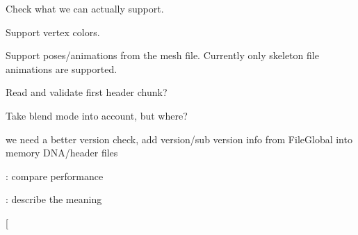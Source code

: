 
\begin{DoxyRefList}
\item[\label{todo__todo000001}%
\hypertarget{todo__todo000001}{}%
Member \hyperlink{class_assimp_1_1_ogre_1_1_ogre_binary_serializer_a3b907a23d6f3d316b4e40767ebda4b68}{Assimp\+:\+:Ogre\+:\+:Ogre\+Binary\+Serializer\+:\+:Import\+Mesh} (Memory\+Stream\+Reader $\ast$reader)]Check what we can actually support.  
\item[\label{todo__todo000003}%
\hypertarget{todo__todo000003}{}%
Class \hyperlink{class_assimp_1_1_ogre_1_1_ogre_importer}{Assimp\+:\+:Ogre\+:\+:Ogre\+Importer} ]Support vertex colors. 

Support poses/animations from the mesh file. Currently only skeleton file animations are supported.  
\item[\label{todo__todo000002}%
\hypertarget{todo__todo000002}{}%
Member \hyperlink{class_assimp_1_1_ogre_1_1_ogre_importer_a9b6609a0b257464d9a1092adf430ebef}{Assimp\+:\+:Ogre\+:\+:Ogre\+Importer\+:\+:Can\+Read} (const std\+::string \&p\+File, I\+O\+System $\ast$p\+I\+O\+Handler, bool check\+Sig) const ]Read and validate first header chunk?  
\item[\label{todo__todo000008}%
\hypertarget{todo__todo000008}{}%
Member \hyperlink{class_assimp_1_1_ogre_1_1_skeleton_a6e29d13ff5cc937a8481c96024da5b0b}{Assimp\+:\+:Ogre\+:\+:Skeleton\+:\+:blend\+Mode} ]Take blend mode into account, but where?  
\item[\label{todo__todo000016}%
\hypertarget{todo__todo000016}{}%
Member \hyperlink{classb_parse_1_1b_file_a2a8cb9d151dfa612f0eb86a705f4bb5d}{b\+Parse\+:\+:b\+File\+:\+:parse\+Internal} (int verbose\+Mode, char $\ast$mem\+Dna, int mem\+Dna\+Length)]we need a better version check, add version/sub version info from File\+Global into memory D\+N\+A/header files  
\item[\label{todo__todo000017}%
\hypertarget{todo__todo000017}{}%
Member \hyperlink{classbt_axis_sweep3_internal_a4e26f4f8acf63f26451f6396223001bb}{bt\+Axis\+Sweep3\+Internal$<$ B\+P\+\_\+\+F\+P\+\_\+\+I\+N\+T\+\_\+\+T\+Y\+P\+E $>$\+:\+:remove\+Handle} (B\+P\+\_\+\+F\+P\+\_\+\+I\+N\+T\+\_\+\+T\+Y\+P\+E handle, \hyperlink{classbt_dispatcher}{bt\+Dispatcher} $\ast$dispatcher)]\+: compare performance  
\item[\label{todo__todo000019}%
\hypertarget{todo__todo000019}{}%
Class \hyperlink{classbt_collision_configuration}{bt\+Collision\+Configuration} ]\+: describe the meaning  
\item[\label{todo__todo000021}%
\hypertarget{todo__todo000021}{}%

\end{DoxyRefList}
